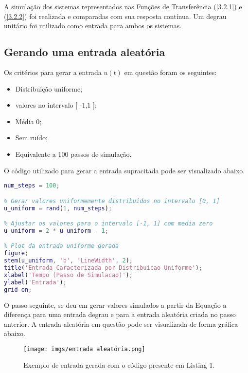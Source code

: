 \documentclass[a4paper,12pt]{article}
\begin{document}
A simulação dos sistemas representados nas Funções de Transferência (\ref{3.2.1}) e (\ref{3.2.2}) foi realizada e comparadas com sua resposta contínua. Um degrau unitário foi utilizado como entrada para ambos os sistemas.

\subsection{Gerando uma entrada aleatória}\label{3.3}

Os critérios para gerar a entrada $u(t)$ em questão foram os seguintes:
\begin{itemize}
    \item Distribuição uniforme;
    \item valores no intervalo [ -1,1 ];
    \item Média $0$;
    \item Sem ruído;
    \item Equivalente a $100$ passos de simulação.
\end{itemize}

O código utilizado para gerar a entrada supracitada pode ser visualizado abaixo.

\begin{lstlisting}[language=Matlab, caption=Código responsável por gerar a Entrada aleatória]
% Numero de passos de simulacao
num_steps = 100;

% Gerar valores uniformemente distribuidos no intervalo [0, 1]
u_uniform = rand(1, num_steps);

% Ajustar os valores para o intervalo [-1, 1] com media zero
u_uniform = 2 * u_uniform - 1;

% Plot da entrada uniforme gerada
figure;
stem(u_uniform, 'b', 'LineWidth', 2);
title('Entrada Caracterizada por Distribuicao Uniforme');
xlabel('Tempo (Passo de Simulacao)');
ylabel('Entrada');
grid on;
\end{lstlisting}

O passo seguinte, se deu em gerar valores simulados a partir da Equação a diferença para uma entrada degrau e para a entrada aleatória criada no passo anterior. A entrada aleatória em questão pode ser visualizada de forma gráfica abaixo.

\begin{figure}[h!]\label{fig1}
  \centering
  \texttt{[image: imgs/entrada aleatória.png]}
  \caption{Exemplo de entrada gerada com o código presente em Listing 1.}
\end{figure}
\end{document}
